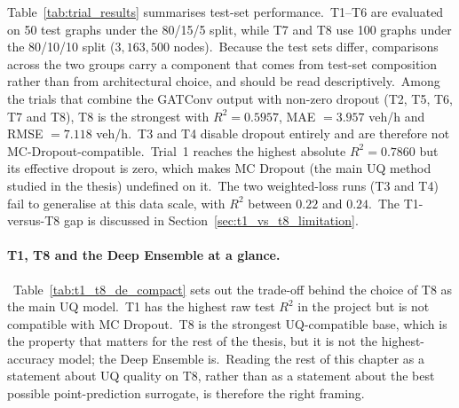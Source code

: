Table~\ref{tab:trial_results} summarises test-set performance.\ T1--T6 are evaluated on 50 test graphs under the 80/15/5 split, while T7 and T8 use 100 graphs under the 80/10/10 split ($3{,}163{,}500$ nodes).\ Because the test sets differ, comparisons across the two groups carry a component that comes from test-set composition rather than from architectural choice, and should be read descriptively.\ Among the trials that combine the GATConv output with non-zero dropout (T2, T5, T6, T7 and T8), T8 is the strongest with $R^2 = 0.5957$, MAE $= 3.957$ veh/h and RMSE $= 7.118$ veh/h.\ T3 and T4 disable dropout entirely and are therefore not MC-Dropout-compatible.\ Trial~1 reaches the highest absolute $R^2 = 0.7860$ but its effective dropout is zero, which makes MC Dropout (the main UQ method studied in the thesis) undefined on it.\ The two weighted-loss runs (T3 and T4) fail to generalise at this data scale, with $R^2$ between $0.22$ and $0.24$.\ The T1-versus-T8 gap is discussed in Section~\ref{sec:t1_vs_t8_limitation}.

\begin{table}[htbp]
\centering
\caption[Test-set performance across the eight base trials]{Test-set performance, recomputed from the saved \texttt{.npz} files.}
\label{tab:trial_results}
\end{table}

\paragraph{T1, T8 and the Deep Ensemble at a glance.}\ Table~\ref{tab:t1_t8_de_compact} sets out the trade-off behind the choice of T8 as the main UQ model.\ T1 has the highest raw test $R^2$ in the project but is not compatible with MC Dropout.\ T8 is the strongest UQ-compatible base, which is the property that matters for the rest of the thesis, but it is not the highest-accuracy model; the Deep Ensemble is.\ Reading the rest of this chapter as a statement about UQ quality on T8, rather than as a statement about the best possible point-prediction surrogate, is therefore the right framing.

